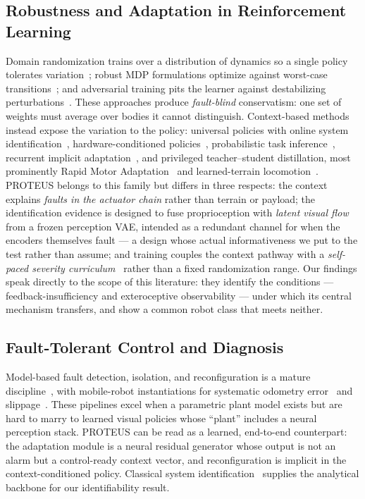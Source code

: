 \documentclass[journal]{IEEEtran}
\begin{document}
\subsection{Robustness and Adaptation in Reinforcement Learning}
Domain randomization trains over a distribution of dynamics so a single
policy tolerates variation~\cite{Tobin2017DR,Peng2018DRDynamics}; robust MDP
formulations optimize against worst-case
transitions~\cite{Nilim2005RobustMDP}; and adversarial training pits the
learner against destabilizing
perturbations~\cite{Pinto2017RARL}. These approaches produce
\emph{fault-blind} conservatism: one set of weights must average over bodies
it cannot distinguish. Context-based methods instead expose the variation to
the policy: universal policies with online system
identification~\cite{Yu2017OSI}, hardware-conditioned
policies~\cite{Chen2018HardwareConditioned}, probabilistic task
inference~\cite{Rakelly2019PEARL}, recurrent implicit
adaptation~\cite{Duan2016RL2}, and privileged teacher--student distillation,
most prominently Rapid Motor Adaptation~\cite{Kumar2021RMA} and
learned-terrain locomotion~\cite{Lee2020LearningQuadrupedal}. PROTEUS
belongs to this family but differs in three respects: the context explains
\emph{faults in the actuator chain} rather than terrain or payload; the
identification evidence is designed to fuse proprioception with \emph{latent
visual flow} from a frozen perception VAE, intended as a redundant channel for
when the encoders themselves fault --- a design whose actual informativeness
we put to the test rather than assume; and training couples the context
pathway with a \emph{self-paced severity
curriculum}~\cite{Klink2022SPDL,Portelas2020ALPGMM} rather than a fixed
randomization range. Our findings speak directly to the scope of this
literature: they identify the conditions --- feedback-insufficiency and
exteroceptive observability --- under which its central mechanism transfers,
and show a common robot class that meets neither.

\subsection{Fault-Tolerant Control and Diagnosis}
Model-based fault detection, isolation, and reconfiguration is a mature
discipline~\cite{Blanke2006Diagnosis,Zhang2008FTC,Michaud2019FaultRobots},
with mobile-robot instantiations for systematic odometry
error~\cite{Borenstein1996UMBmark} and slippage~\cite{Visser2004SlipDetection}.
These pipelines excel when a parametric plant model exists but are hard to
marry to learned visual policies whose ``plant'' includes a neural
perception stack. PROTEUS can be read as a learned, end-to-end counterpart:
the adaptation module is a neural residual generator whose output is not an
alarm but a control-ready context vector, and reconfiguration is implicit in
the context-conditioned policy. Classical system
identification~\cite{Ljung1999SysId} supplies the analytical backbone for
our identifiability result.
\end{document}
